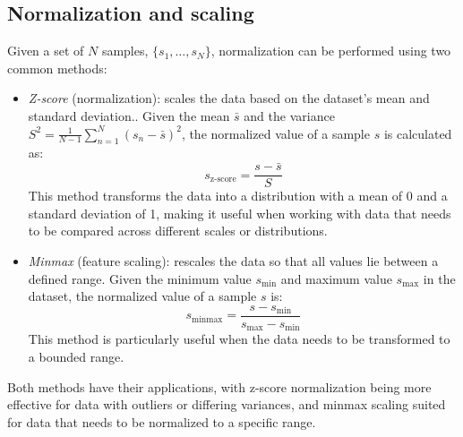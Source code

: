 \subsection{Normalization and scaling}
Given a set of $N$ samples, $\{s_1,\dots,s_N\}$, normalization can be performed using two common methods:
\begin{itemize}
    \item \textit{Z-score} (normalization): scales the data based on the dataset's mean and standard deviation.. 
        Given the mean $\bar{s}$ and the variance $S^2=\frac{1}{N-1}\sum_{n=1}^N(s_n-\bar{s})^2$, the normalized value of a sample $s$ is calculated as:
        \[s_{\text{z-score}}=\dfrac{s-\bar{s}}{S}\]
        This method transforms the data into a distribution with a mean of 0 and a standard deviation of 1, making it useful when working with data that needs to be compared across different scales or distributions.
    \item \textit{Minmax} (feature scaling): rescales the data so that all values lie between a defined range.
        Given the minimum value $s_{\min}$ and maximum value $s_{\max}$ in the dataset, the normalized value of a sample $s$ is: 
        \[s_{\text{minmax}}=\dfrac{s-s_{\min}}{s_{\max}-s_{\min}}\]
        This method is particularly useful when the data needs to be transformed to a bounded range.
\end{itemize}
Both methods have their applications, with z-score normalization being more effective for data with outliers or differing variances, and minmax scaling suited for data that needs to be normalized to a specific range.

